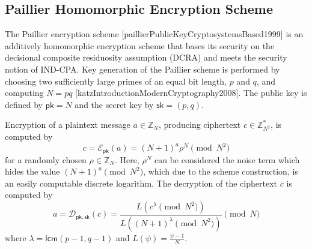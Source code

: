 \subsection{Paillier Homomorphic Encryption Scheme}\label{subsec:prelims:paillier}
The Paillier encryption scheme [paillierPublicKeyCryptosystemsBased1999] is an additively homomorphic encryption scheme that bases its security on the decisional composite residuosity assumption (DCRA) and meets the security notion of IND-CPA. Key generation of the Paillier scheme is performed by choosing two sufficiently large primes of an equal bit length, $p$ and $q$, and computing $N=pq$ [katzIntroductionModernCryptography2008]. The public key is defined by $\mathsf{pk}=N$ and the secret key by $\mathsf{sk}=(p, q)$.

Encryption of a plaintext message $a \in \mathbb{Z}_N$, producing ciphertext $c \in \mathbb{Z}^{*}_{N^2}$, is computed by
\begin{equation}
    c=\mathcal{E}_{\mathsf{pk}}(a) = (N+1)^a \rho^N \pmod{N^2}
\end{equation}
for a randomly chosen $\rho \in \mathbb{Z}_{N}$. Here, $\rho^N$ can be considered the noise term which hides the value $(N+1)^a \pmod{N^2}$, which due to the scheme construction, is an easily computable discrete logarithm. The decryption of the ciphertext $c$ is computed by
\begin{equation}
    a=\mathcal{D}_{\mathsf{pk},\mathsf{sk}}(c) = \frac{L(c^\lambda\pmod{N^2})}{L((N+1)^\lambda\pmod{N^2})} \pmod{N}
\end{equation}
where $\lambda = \mathsf{lcm}(p-1, q-1)$ and $L(\psi) = \frac{\psi-1}{N}$.

